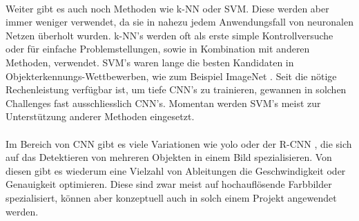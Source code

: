 \\
Weiter gibt es auch noch Methoden wie \gls{k-NN} oder \gls{SVM}. Diese werden aber immer weniger verwendet, da sie in nahezu jedem Anwendungsfall von neuronalen Netzen überholt wurden. \gls{k-NN}'s werden oft als erste simple Kontrollversuche oder für einfache Problemstellungen, sowie in Kombination mit anderen Methoden, verwendet. \gls{SVM}'s waren lange die besten Kandidaten in Objekterkennungs-Wettbewerben, wie zum Beispiel ImageNet \parencite{ILSVRC15}. Seit die nötige Rechenleistung verfügbar ist, um tiefe \gls{CNN}'s zu trainieren, gewannen in solchen Challenges fast ausschliesslich \gls{CNN}'s. Momentan werden \gls{SVM}'s meist zur Unterstützung anderer Methoden eingesetzt.\\
\\
Im Bereich von \gls{CNN} gibt es viele Variationen wie \gls{yolo} oder der \gls{R-CNN} \parencite{yoloRCnn}, die sich auf das Detektieren von mehreren Objekten in einem Bild spezialisieren. Von diesen gibt es wiederum eine Vielzahl von Ableitungen die Geschwindigkeit oder Genauigkeit optimieren. Diese sind zwar meist auf hochauflösende Farbbilder spezialisiert, können aber konzeptuell auch in solch einem Projekt angewendet werden.

